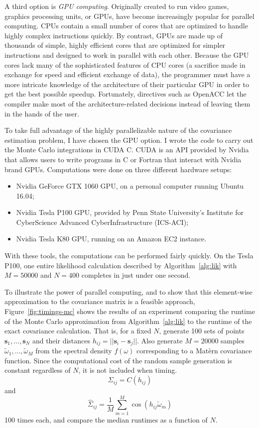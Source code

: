\documentclass[12pt]{article}
\begin{document}
A third option is \emph{GPU computing}. Originally created to run video games, graphics processing units, or GPUs, have become increasingly popular for parallel computing. CPUs contain a small number of cores that are optimized to handle highly complex instructions quickly. By contrast, GPUs are made up of thousands of simple, highly efficient cores that are optimized for simpler instructions and designed to work in parallel with each other. Because the GPU cores lack many of the sophisticated features of CPU cores (a sacrifice made in exchange for speed and efficient exchange of data), the programmer must have a more intricate knowledge of the architecture of their particular GPU in order to get the best possible speedup. Fortunately, directives such as OpenACC let the compiler make most of the architecture-related decisions instead of leaving them in the hands of the user.

To take full advantage of the highly parallelizable nature of the covariance estimation problem, I have chosen the GPU option. I wrote the code to carry out the Monte Carlo integrations in CUDA C. CUDA is an API provided by Nvidia that allows users to write programs in C or Fortran that interact with Nvidia brand GPUs. Computations were done on three different hardware setups:

\begin{itemize}
  \item Nvidia GeForce GTX 1060 GPU, on a personal computer running Ubuntu 16.04;
  \item Nvidia Tesla P100 GPU, provided by Penn State University's Institute for CyberScience Advanced CyberInfrastructure (ICS-ACI);
  \item Nvidia Tesla K80 GPU, running on an Amazon EC2 instance.
\end{itemize}

With these tools, the computations can be performed fairly quickly. On the Tesla P100, one entire likelihood calculation described by Algorithm~\ref{alg:lik} with $M = 50000$ and $N = 400$ completes in just under one second.

To illustrate the power of parallel computing, and to show that this element-wise approximation to the covariance matrix is a feasible approach, Figure~\ref{fig:timings-mc} shows the results of an experiment comparing the runtime of the Monte Carlo approximation from Algorithm~\ref{alg:lik} to the runtime of the exact covariance calculation. That is, for a fixed $N$, generate 100 sets of points $\bm{s}_1, \dots, \bm{s}_N$ and their distances $h_{ij} = ||\bm{s}_i - \bm{s}_j||$. Also generate $M = 20000$ samples $\widetilde{\omega}_1, \dots, \widetilde{\omega}_M$ from the spectral density $f(\omega)$ corresponding to a Mat\`ern covariance function. Since the computational cost of the random sample generation is constant regardless of $N$, it is not included when timing.
\[
  \Sigma_{ij} = C(h_{ij})
\]
and
\[
  \widehat{\Sigma}_{ij} = \frac{1}{M}\sum_{m=1}^M \cos(h_{ij} \widetilde{\omega}_{m})
\]
100 times each, and compare the median runtimes as a function of $N$.
\end{document}
